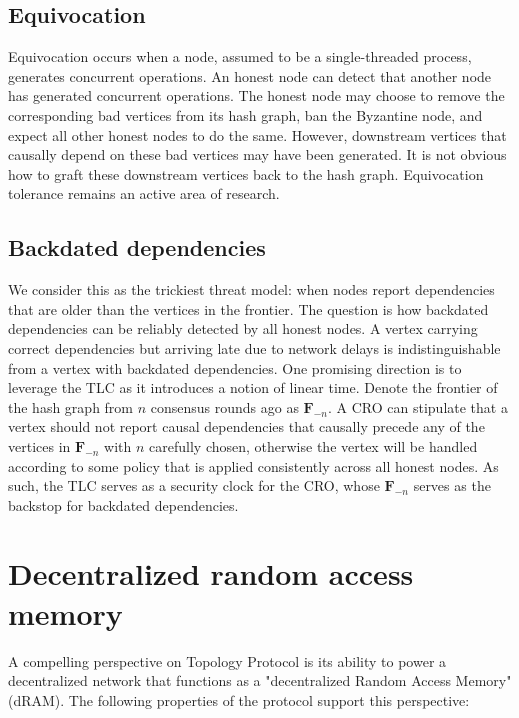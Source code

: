 \documentclass{article}
\begin{document}
\subsection {Equivocation}
Equivocation occurs when a node, assumed to be a single-threaded process, generates concurrent operations. An honest node can detect that another node has generated concurrent operations. The honest node may choose to remove the corresponding bad vertices from its hash graph, ban the Byzantine node, and expect all other honest nodes to do the same. However, downstream vertices that causally depend on these bad vertices may have been generated. It is not obvious how to graft these downstream vertices back to the hash graph. Equivocation tolerance remains an active area of research.

\subsection {Backdated dependencies}
We consider this as the trickiest threat model: when nodes report dependencies that are older than the vertices in the frontier. The question is how backdated dependencies can be reliably detected by all honest nodes. A vertex carrying correct dependencies but arriving late due to network delays is indistinguishable from a vertex with backdated dependencies. One promising direction is to leverage the TLC as it introduces a notion of linear time. Denote the frontier of the hash graph from $n$ consensus rounds ago as $\textbf{F}_{-n}$. A CRO can stipulate that a vertex should not report causal dependencies that causally precede any of the vertices in $\textbf{F}_{-n}$ with $n$ carefully chosen, otherwise the vertex will be handled according to some policy that is applied consistently across all honest nodes. As such, the TLC serves as a security clock for the CRO, whose $\textbf{F}_{-n}$ serves as the backstop for backdated dependencies.

\section{Decentralized random access memory}
\label{sec:headings}

A compelling perspective on Topology Protocol is its ability to power a decentralized network that functions as a "decentralized Random Access Memory" (dRAM). The following properties of the protocol support this perspective:
\end{document}
